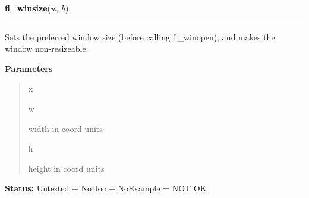     \label{xformslib:library:fl_winsize}

    \vspace{0.5ex}

\hspace{.8\funcindent}\begin{boxedminipage}{\funcwidth}

    \raggedright \textbf{fl\_winsize}(\textit{w}, \textit{h})

    \vspace{-1.5ex}

    \rule{\textwidth}{0.5\fboxrule}
\setlength{\parskip}{2ex}
    Sets the preferred window size (before calling fl\_winopen), and makes 
    the window non-resizeable.

\setlength{\parskip}{1ex}
      \textbf{Parameters}
      \vspace{-1ex}

      \begin{quote}
        \begin{Ventry}{x}

          \item[w]

          width in coord units

          \item[h]

          height in coord units

        \end{Ventry}

      \end{quote}

\textbf{Status:} Untested + NoDoc + NoExample = NOT OK



    \end{boxedminipage}

    \label{xformslib:library:fl_initial_winsize}

    \vspace{0.5ex}

